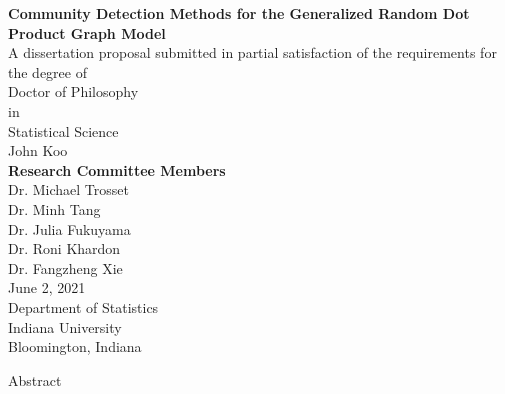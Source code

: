 \documentclass[
  11pt,
]{article}
\author{}
\date{\vspace{-2.5em}}
\begin{document}

\begin{center}
\LARGE{\textbf{Community Detection Methods for the Generalized Random Dot Product Graph Model}}\\
\vspace*{2\baselineskip}
\normalsize{A dissertation proposal submitted in partial satisfaction of the requirements for the degree of \\}
Doctor of Philosophy \\
in \\
Statistical Science \\
\vspace*{2\baselineskip}
\Large{John Koo}\\
\vspace*{3\baselineskip}
\Large{\textbf{Research Committee Members}}\\
Dr. Michael Trosset \\
Dr. Minh Tang \\
Dr. Julia Fukuyama \\
Dr. Roni Khardon \\
Dr. Fangzheng Xie \\
\vspace*{3\baselineskip}
June 2, 2021 \\
\vspace*{1\baselineskip}
Department of Statistics \\
Indiana University \\
Bloomington, Indiana \\
\end{center}

\hypersetup{linkcolor = black}
\newpage
{}
\tableofcontents
{}

\newpage

\begin{center}
\LARGE{Abstract}
\end{center}

\vspace*{2\baselineskip}

\normalsize
\end{document}
